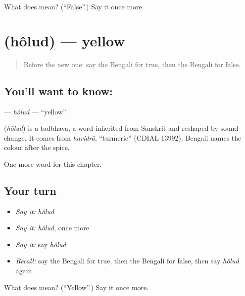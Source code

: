 \begin{tcolorbox}[breakable,colback=teal!4,colframe=teal!35!black,title={Before you move on}]
What does  mean? (\textquotedblleft{}False\textquotedblright{}.) Say it once more.
\end{tcolorbox}
\section[\texorpdfstring{\bn{হলুদ} (hôlud)}{হলুদ (hôlud)}]{ (hôlud) — yellow}

\label{lesson:BN-C77-holud}



\begin{quote}
Before the new one: say the Bengali for true, then the Bengali for false.
\end{quote}

\subsection*{You'll want to know: }
\textbf{} — \emph{hôlud} — \textquotedblleft{}yellow\textquotedblright{}.

\begin{cousinweb}
\textbf{} (\emph{hôlud}) is a tadbhava, a word inherited from Sanskrit and reshaped by sound change. It comes from \emph{haridrā}, \textquotedblleft{}turmeric\textquotedblright{} (CDIAL 13992). Bengali names the colour after the spice.
\end{cousinweb}

\begin{grammarlens}[title={What you've built}]
One more word for this chapter.
\end{grammarlens}

\subsection*{Your turn}
\begin{itemize}
\raggedright
  \item \emph{Say it:} \emph{hôlud}
  \item \emph{Say it:} \emph{hôlud}, once more
  \item \emph{Say it:} say \emph{hôlud}
  \item \emph{Recall:} say the Bengali for true, then the Bengali for false, then say \emph{hôlud} again
\end{itemize}

\begin{tcolorbox}[breakable,colback=teal!4,colframe=teal!35!black,title={Before you move on}]
What does  mean? (\textquotedblleft{}Yellow\textquotedblright{}.) Say it once more.
\end{tcolorbox}

